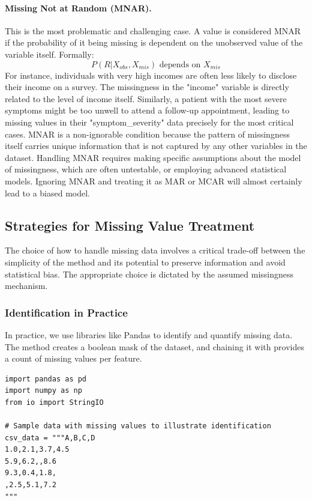 \begin{itemize}
\paragraph{Missing Not at Random (MNAR).} This is the most problematic and challenging case. A value is considered MNAR if the probability of it being missing is dependent on the unobserved value of the variable itself. Formally:
$$ P(R | X_{obs}, X_{mis}) \text{ depends on } X_{mis} $$
For instance, individuals with very high incomes are often less likely to disclose their income on a survey. The missingness in the "income" variable is directly related to the level of income itself. Similarly, a patient with the most severe symptoms might be too unwell to attend a follow-up appointment, leading to missing values in their "symptom\_severity" data precisely for the most critical cases. MNAR is a non-ignorable condition because the pattern of missingness itself carries unique information that is not captured by any other variables in the dataset. Handling MNAR requires making specific assumptions about the model of missingness, which are often untestable, or employing advanced statistical models. Ignoring MNAR and treating it as MAR or MCAR will almost certainly lead to a biased model.

\subsection{Strategies for Missing Value Treatment}
\label{subsec:missing_data_strategies}
The choice of how to handle missing data involves a critical trade-off between the simplicity of the method and its potential to preserve information and avoid statistical bias. The appropriate choice is dictated by the assumed missingness mechanism.

\subsubsection*{Identification in Practice}
In practice, we use libraries like Pandas to identify and quantify missing data. The  method creates a boolean mask of the dataset, and chaining it with  provides a count of missing values per feature.
\begin{verbatim}
import pandas as pd
import numpy as np
from io import StringIO

# Sample data with missing values to illustrate identification
csv_data = """A,B,C,D
1.0,2.1,3.7,4.5
5.9,6.2,,8.6
9.3,0.4,1.8,
,2.5,5.1,7.2
"""


\end{verbatim}
\end{itemize}
